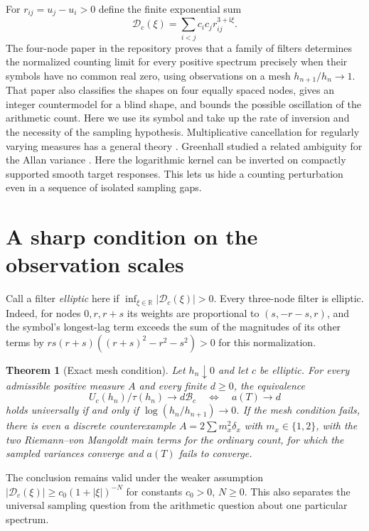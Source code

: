 \documentclass[11pt,letterpaper]{article}
\newtheorem{theorem}{Theorem}[section]
\theoremstyle{definition}
\newcommand{\R}{\mathbb R}
\newcommand{\ii}{\mathrm i}
\newcommand{\BB}{\mathcal B}
\newcommand{\sym}{\mathcal D}
\begin{document}
For $r_{ij}=u_j-u_i>0$ define the finite exponential sum
\[
 \sym_c(\xi)=\sum_{i<j}c_ic_j r_{ij}^{3+\ii\xi}.
\]
The four-node paper in the repository \cite{four} proves that a family of filters determines the normalized counting limit for every positive spectrum precisely when their symbols have no common real zero, using observations on a mesh $h_{n+1}/h_n\to1$. That paper also classifies the shapes on four equally spaced nodes, gives an integer countermodel for a blind shape, and bounds the possible oscillation of the arithmetic count. Here we use its symbol and take up the rate of inversion and the necessity of the sampling hypothesis. Multiplicative cancellation for regularly varying measures has a general theory \cite{JMRS}. Greenhall studied a related ambiguity for the Allan variance \cite{Greenhall}. Here the logarithmic kernel can be inverted on compactly supported smooth target responses. This lets us hide a counting perturbation even in a sequence of isolated sampling gaps.



\section{A sharp condition on the observation scales}
Call a filter \emph{elliptic} here if $\inf_{\xi\in\R}|\sym_c(\xi)|>0$. Every three-node filter is elliptic. Indeed, for nodes $0,r,r+s$ its weights are proportional to $(s,-r-s,r)$, and the symbol's longest-lag term exceeds the sum of the magnitudes of its other terms by $rs(r+s)((r+s)^2-r^2-s^2)>0$ for this normalization.
\begin{theorem}[Exact mesh condition]\label{thm:mesh}
Let $h_n\downarrow0$ and let $c$ be elliptic. For every admissible positive measure $A$ and every finite $d\ge0$, the equivalence
\[
 U_c(h_n)/\tau(h_n)\longrightarrow d\BB_c
 \quad\Longleftrightarrow\quad a(T)\longrightarrow d
\]
holds universally if and only if $\log(h_n/h_{n+1})\to0$.
If the mesh condition fails, there is even a discrete counterexample $A=2\sum m_x^2\delta_x$ with $m_x\in\{1,2\}$, with the two Riemann--von Mangoldt main terms for the ordinary count, for which the sampled variances converge and $a(T)$ fails to converge.
\end{theorem}
The conclusion remains valid under the weaker assumption $|\sym_c(\xi)|\ge c_0(1+|\xi|)^{-N}$ for constants $c_0>0$, $N\ge0$. This also separates the universal sampling question from the arithmetic question about one particular spectrum.
\end{document}
